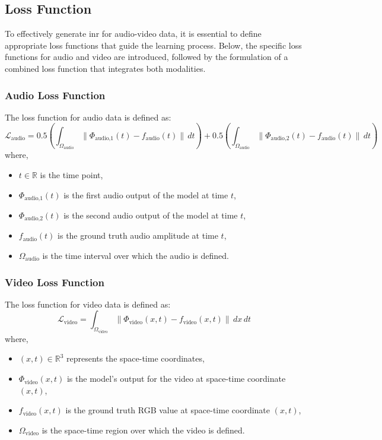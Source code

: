 \documentclass{ioereport}
\begin{document}
    \subsection{Loss Function}
    To effectively generate \gls{inr} for audio-video data, it is essential to define appropriate loss functions that guide the learning process. Below, the specific loss functions for audio and video are introduced, followed by the formulation of a combined loss function that integrates both modalities.

        \subsubsection{Audio Loss Function}
        The loss function for audio data is defined as:
        \begin{equation}
            \mathcal{L}_{\text{audio}} = 0.5 \left( \int_{\Omega_{\text{audio}}} \| \Phi_{\text{audio,1}}(t) - f_{\text{audio}}(t) \| \, dt \right) + 0.5 \left( \int_{\Omega_{\text{audio}}} \| \Phi_{\text{audio,2}}(t) - f_{\text{audio}}(t) \| \, dt \right)
        \end{equation}
        where,
        \begin{itemize}
            \item \( t \in \mathbb{R} \) is the time point,
            \item  \( \Phi_{\text{audio,1}}(t) \) is the first audio output of the model at time \( t \),
            \item \( \Phi_{\text{audio,2}}(t) \) is the second audio output of the model at time \( t \),
            \item \( f_{\text{audio}}(t) \) is the ground truth audio amplitude at time \( t \),
            \item \( \Omega_{\text{audio}} \) is the time interval over which the audio is defined.
        \end{itemize}
    
        \subsubsection{Video Loss Function}
            The loss function for video data is defined as:
        \begin{equation}
            \mathcal{L}_{\text{video}} = \int_{\Omega_{\text{video}}} \| \Phi_{\text{video}}(x, t) - f_{\text{video}}(x, t) \| \, dx \, dt
        \end{equation}
        where,
        \begin{itemize}
        \item \( (x, t) \in \mathbb{R}^3 \) represents the space-time coordinates,
        \item \( \Phi_{\text{video}}(x, t) \) is the model's output for the video at space-time coordinate \( (x, t) \),
        \item \( f_{\text{video}}(x, t) \) is the ground truth RGB value at space-time coordinate \( (x, t) \),
        \item \( \Omega_{\text{video}} \) is the space-time region over which the video is defined.
        \end{itemize}
    
\end{document}
